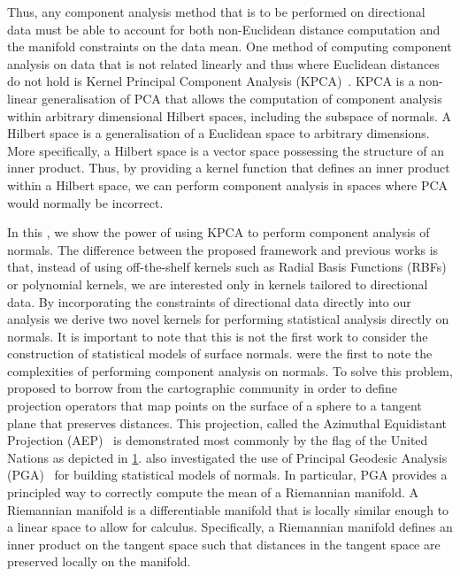 \begin{figure}[t]
\begin{minipage}[t]{.45\textwidth}
\label{fig:singl_img_united_nations}
	\end{minipage}
\end{figure}
Thus, any component analysis method that is to be performed on directional data
must be able to account for both non-Euclidean distance computation 
and the manifold constraints on the data mean. 
One method of computing component analysis on data that is
not related linearly and thus where Euclidean distances do not hold is
Kernel Principal Component Analysis (KPCA)~\cite{scholkopf1998nonlinear}.
KPCA is a non-linear generalisation of PCA that allows the computation
of component analysis within arbitrary dimensional Hilbert spaces,
including the subspace of normals. A Hilbert space is a generalisation
of a Euclidean space to arbitrary dimensions. More specifically, a Hilbert
space is a vector space possessing the structure of an inner
product. Thus, by providing a kernel function that defines
an inner product within a Hilbert space, we can perform component analysis in
spaces where PCA would normally be incorrect.

In this , we show the power of using KPCA to perform
component analysis of normals. The difference between the proposed framework and
previous works is that, instead of using off-the-shelf kernels such as Radial
Basis Functions (RBFs) or polynomial kernels, we are interested only in kernels
tailored to directional data. By incorporating the constraints of directional
data directly into our analysis we derive two novel kernels for performing
statistical analysis directly on normals. It is important to note that this is
not the first work to consider the construction of statistical models of surface
normals. \citet{smith2006recovering,smith2008facial} were the
first to note the complexities of performing component analysis on normals. To
solve this problem, \citet{smith2006recovering,smith2008facial}
proposed to borrow from the cartographic
community in order to define projection operators that map points on the surface
of a sphere to a tangent plane that preserves distances. This projection, called
the Azimuthal Equidistant Projection (AEP)~\cite{snyder1987map} is demonstrated
most commonly by the flag of the United Nations as depicted in
\cref{fig:singl_img_united_nations}.
\citet{smith2008facial} also investigated the use of
Principal Geodesic Analysis (PGA)~\cite{fletcher2004principal,smith2008facial}
for building statistical models of normals. In particular, PGA provides a
principled way to correctly compute the mean of a Riemannian manifold.
A Riemannian manifold is a differentiable manifold that is locally similar
enough to a linear space to allow for calculus. Specifically, a Riemannian
manifold defines an inner product on the tangent space such that distances
in the tangent space are preserved locally on the manifold. 

